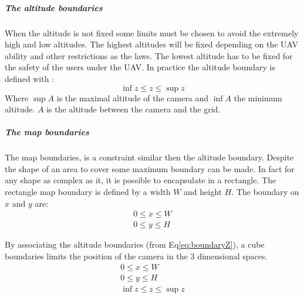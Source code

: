 \subparagraph{The altitude boundaries}\label{sec:altitudeBoundary}
 When the altitude is not fixed some limits must be chosen to avoid the extremely high and low altitudes. The highest altitudes will be fixed depending on the UAV ability and other restrictions as the laws. The lowest altitude has to be fixed for the safety of the users under the UAV.  
In practice the  altitude boundary is defined with :
 \begin{equation}\label{eq:boundaryZ}
   \inf z\leq z\leq \sup z  
 \end{equation} 
 Where $\sup A$ is the maximal altitude of the camera and $\inf A$ the minimum altitude. $A$ is the altitude between the camera and the grid. %
 
 \subparagraph{The map boundaries}
The map boundaries, is a constraint similar then the altitude boundary. Despite the shape of an area to cover some maximum boundary can be made. In fact for any shape as complex as it, it is  possible to encapsulate in a rectangle. The rectangle map boundary is defined by a width $W$ and height $H$. The boundary on $x$ and $y$ are:
 \begin{equation}
  \begin{array}{lcl}
  	0\leq x\leq W \\
  	 0\leq y\leq H 
  \end{array} 
 \end{equation}  
 
By associating the altitude boundaries (from Eq\ref{eq:boundaryZ}), a cube boundaries limits the position of the camera in the 3 dimensional spaces. 
\begin{equation}\label{eq:3dBoundary}
  \begin{array}{lclcl}
  	0\leq x\leq W \\ 0\leq y\leq H  \\ \inf z\leq z\leq \sup z  
  \end{array} 
 \end{equation} 
 

